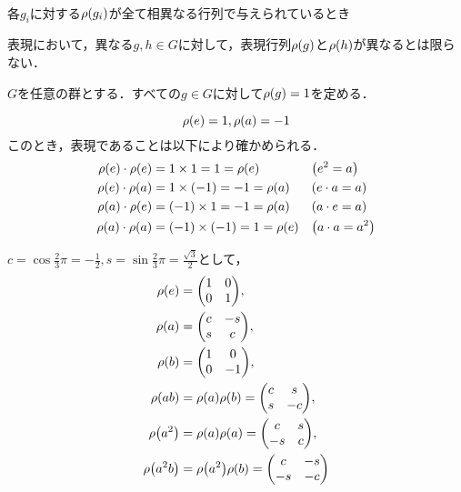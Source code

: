 \documentclass[main]{subfiles}
\begin{document}
	\paragraph{} 各$g_i$に対する$\rho\qty(g_i)$が全て相異なる行列で与えられているとき
		\begin{remark*}
			表現において，異なる$g,h\in G$に対して，表現行列$\rho\qty(g)$と$\rho\qty(h)$が異なるとは限らない．
		\end{remark*}
		\begin{ex}
			$G$を任意の群とする．すべての$g\in G$に対して$\rho\qty(g)=1$を定める．
		\end{ex}
		\begin{ex}[$\rho_\text{ex2}$:巡回群$C_2=\braket{a}{a^2=1}$の忠実な1次元表現]
			\[\rho\qty(e)=1,\rho\qty(a)=-1\]
			このとき，表現であることは以下により確かめられる．
			\begin{align*}
				\rho\qty(e)\cdot\rho\qty(e) & =1\times 1=1=\rho\qty(e)                          &  & \qty(e^2=a)        \\
				\rho\qty(e)\cdot\rho\qty(a) & =1\times\qty(-1)=-1=\rho\qty(a)                   &  & \qty(e\cdot a=a)   \\
				\rho\qty(a)\cdot\rho\qty(e) & =\qty(-1)\times 1=-1=\rho\qty(a)                  &  & \qty(a\cdot e=a)   \\
				\rho\qty(a)\cdot\rho\qty(a) & =\qty(-1)\times\qty(-1)          = 1 =\rho\qty(e) &  & \qty(a\cdot a=a^2)
			\end{align*}
		\end{ex}
		\begin{ex}[$\rho_\text{ex3}$:$D_3=\braket{a,b}{a^3=b^2=abab=e}$の2次元忠実表現]
			$c=\cos\frac{2}{3}\pi=-\frac{1}{2},s=\sin\frac{2}{3}\pi=\frac{\sqrt{3}}{2}$として，
			\begin{align*}
				\rho\qty(e)    & =\mqty(1                          & 0  \\0&1),\\
				\rho\qty(a)    & =\mqty(c                          & -s \\s&c),\\
				\rho\qty(b)    & =\mqty(1                          & 0  \\0&-1),\\
				\rho\qty(ab)   & =\rho\qty(a)\rho\qty(b)=\mqty(c   & s  \\s&-c),\\
				\rho\qty(a^2)  & =\rho\qty(a)\rho\qty(a)=\mqty(c   & s  \\-s&c),\\
				\rho\qty(a^2b) & =\rho\qty(a^2)\rho\qty(b)=\mqty(c & -s \\-s&-c)
			\end{align*}
		\end{ex}
\end{document}
